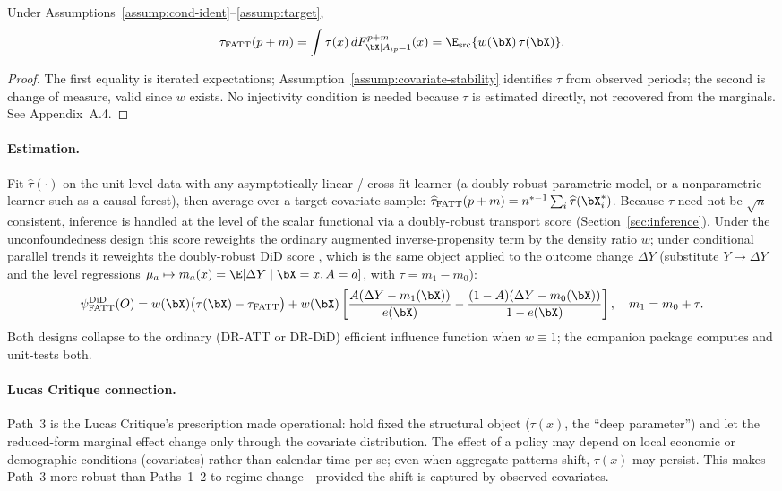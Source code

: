 \documentclass{article}
\begin{document}
\begin{proposition}
\label{prop:path3}
Under Assumptions~\ref{assump:cond-ident}--\ref{assump:target},
\begin{align}
\tau_{\text{FATT}}(p+m) = \int \tau(x) \, dF^{p+m}_{\bX \mid A_{ip}=1}(x) = \E_{\mathrm{src}}\{w(\bX)\,\tau(\bX)\}.
\end{align}
\end{proposition}

\begin{proof}
The first equality is iterated expectations; Assumption~\ref{assump:covariate-stability} identifies $\tau$ from observed periods; the second is change of measure, valid since $w$ exists. No injectivity condition is needed because $\tau$ is estimated directly, not recovered from the marginals. See Appendix~A.4.
\end{proof}

\paragraph{Estimation.} Fit $\widehat{\tau}(\cdot)$ on the unit-level data with any asymptotically linear / cross-fit learner (a doubly-robust parametric model, or a nonparametric learner such as a causal forest), then average over a target covariate sample: $\widehat{\tau}_{\text{FATT}}(p+m) = n^{*-1}\sum_i \widehat{\tau}(\bX_i^*)$. Because $\widehat{\tau}$ need not be $\sqrt{n}$-consistent, inference is handled at the level of the scalar functional via a doubly-robust transport score (Section~\ref{sec:inference}). Under the unconfoundedness design this score reweights the ordinary augmented inverse-propensity term by the density ratio $w$; under conditional parallel trends it reweights the doubly-robust DiD score \citep{santannaDoublyRobustDifferenceindifferences2020}, which is the same object applied to the outcome change $\Delta Y$ (substitute $Y \mapsto \Delta Y$ and the level regressions $\mu_a \mapsto m_a(x) = \E[\Delta Y \mid \bX = x, A = a]$, with $\tau = m_1 - m_0$):
\[
\psi^{\mathrm{DiD}}_{\text{FATT}}(O) = w(\bX)\big(\tau(\bX) - \tau_{\text{FATT}}\big) + w(\bX)\left[\frac{A(\Delta Y - m_1(\bX))}{e(\bX)} - \frac{(1-A)(\Delta Y - m_0(\bX))}{1 - e(\bX)}\right], \quad m_1 = m_0 + \tau.
\]
Both designs collapse to the ordinary (DR-ATT or DR-DiD) efficient influence function when $w \equiv 1$; the companion package computes and unit-tests both.

\paragraph{Lucas Critique connection.} Path~3 is the Lucas Critique's prescription made operational: hold fixed the structural object ($\tau(x)$, the ``deep parameter'') and let the reduced-form marginal effect change only through the covariate distribution. The effect of a policy may depend on local economic or demographic conditions (covariates) rather than calendar time per se; even when aggregate patterns shift, $\tau(x)$ may persist. This makes Path~3 more robust than Paths~1--2 to regime change---provided the shift is captured by observed covariates.
\end{document}
